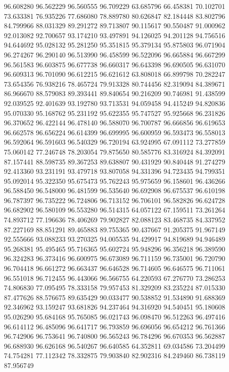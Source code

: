 96.608280
96.562229
96.560555
96.709229
63.685796
66.458381
70.102701
73.633381
76.935226
77.686080
78.889780
80.626847
82.184448
83.802796
84.799966
88.031329
89.291272
89.713807
90.115617
90.550487
91.000962
92.013082
92.700657
93.174210
93.497891
94.126025
94.201128
94.756516
94.644692
95.028132
95.281250
95.351815
95.379134
95.875803
96.071904
96.274267
96.290140
96.513990
96.458599
96.522096
96.665884
96.667299
96.561583
96.603875
96.677738
96.660317
96.643398
96.690505
96.631070
96.609313
96.701090
96.612215
96.621612
63.808018
66.899798
70.282247
73.654356
76.938216
78.465724
79.913328
80.744456
82.319094
84.389671
86.966670
88.579083
89.393441
89.840654
90.216209
90.746981
91.438599
92.039525
92.401639
93.192780
93.713531
94.059458
94.415249
94.820836
95.070330
95.168762
95.231192
95.622355
95.747527
95.925668
96.231826
96.370652
96.422144
96.478140
96.588070
96.700787
96.666856
96.619653
96.662578
96.656224
96.614399
96.699995
96.600959
96.593473
96.558013
96.592064
96.591603
96.540329
96.720194
63.924995
67.091112
73.277859
75.060142
77.246748
78.203054
79.875650
80.585776
83.316924
84.392091
87.157441
88.598735
89.367253
89.638807
90.431929
90.840448
91.274279
92.413360
93.231191
93.479718
93.807058
94.331396
94.723435
94.799351
95.092014
95.322350
95.675473
95.762243
95.975659
96.158601
96.436266
96.588450
96.548000
96.481599
96.535640
96.692908
96.675537
96.610198
96.787397
96.735222
96.724806
96.713152
96.706101
96.582826
96.624728
96.682902
96.580109
96.553280
96.514315
64.057122
67.159511
73.261264
74.893712
77.196636
78.406269
79.902827
82.088123
83.468735
84.337952
87.227169
88.851291
89.465883
89.755365
90.437667
91.205375
91.967149
92.555666
93.088233
93.270325
94.005535
94.429917
94.819689
94.946489
95.268381
95.495465
95.716365
95.602724
95.948296
96.356218
96.389590
96.324283
96.373416
96.600975
96.673089
96.711159
96.735001
96.720790
96.704418
96.661272
96.663437
96.646528
96.714605
96.646575
96.711061
96.551018
96.712455
96.443066
96.566755
64.220593
67.276770
73.286253
74.806830
77.095495
78.333158
79.957453
81.329209
83.235224
87.015330
87.477626
88.576675
89.635429
90.033477
90.538852
91.534890
91.688369
92.346962
93.159247
93.681826
94.237464
94.316920
94.540451
95.180608
95.026290
95.684168
95.765085
96.021743
96.098470
96.512263
96.497416
96.614112
96.485096
96.641717
96.793859
96.696056
96.654212
96.761366
96.742906
96.753641
96.740800
96.565243
96.784296
96.670353
96.562887
96.688930
96.626168
96.540267
96.640585
64.352811
69.034586
73.204499
74.754281
77.112342
78.332875
79.903840
82.902316
84.249460
86.738119
87.956749
